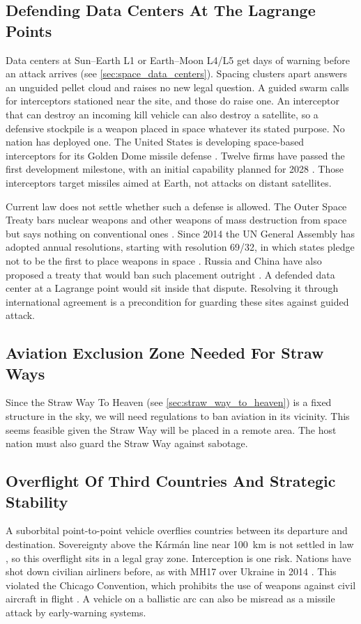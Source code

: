 \documentclass{article}
\begin{document}
\subsection{Defending Data Centers At The Lagrange Points}\label{sec:lpoint_defense_policy}
Data centers at Sun--Earth L1 or Earth--Moon L4/L5 get days of warning before an attack arrives (see \autoref{sec:space_data_centers}). Spacing clusters apart answers an unguided pellet cloud and raises no new legal question. A guided swarm calls for interceptors stationed near the site, and those do raise one. An interceptor that can destroy an incoming kill vehicle can also destroy a satellite, so a defensive stockpile is a weapon placed in space whatever its stated purpose. No nation has deployed one. The United States is developing space-based interceptors for its Golden Dome missile defense \cite{crs_golden_dome}. Twelve firms have passed the first development milestone, with an initial capability planned for 2028 \cite{hitchens2026_sbi_gate1}. Those interceptors target missiles aimed at Earth, not attacks on distant satellites.

Current law does not settle whether such a defense is allowed. The Outer Space Treaty bars nuclear weapons and other weapons of mass destruction from space but says nothing on conventional ones \cite{outer_space_treaty}. Since 2014 the UN General Assembly has adopted annual resolutions, starting with resolution 69/32, in which states pledge not to be the first to place weapons in space \cite{liu2016_no_first_placement}. Russia and China have also proposed a treaty that would ban such placement outright \cite{tronchetti2015_ppwt}. A defended data center at a Lagrange point would sit inside that dispute. Resolving it through international agreement is a precondition for guarding these sites against guided attack.

\subsection{Aviation Exclusion Zone Needed For Straw Ways}
Since the Straw Way To Heaven (see \autoref{sec:straw_way_to_heaven}) is a fixed structure in the sky, we will need regulations to ban aviation in its vicinity.   This seems feasible given the Straw Way will be placed in a remote area.   The host nation must also guard the Straw Way against sabotage.


\subsection{Overflight Of Third Countries And Strategic Stability}\label{sec:overflight_politics}
A suborbital point-to-point vehicle overflies countries between its departure and destination. Sovereignty above the Kármán line near \SI{100}{\kilo\meter} is not settled in law \cite{mcdowell2018karman}, so this overflight sits in a legal gray zone. Interception is one risk. Nations have shot down civilian airliners before, as with MH17 over Ukraine in 2014 \cite{dsb_mh17}. This violated the Chicago Convention, which prohibits the use of weapons against civil aircraft in flight \cite{chicago_3bis}. A vehicle on a ballistic arc can also be misread as a missile attack by early-warning systems.
\end{document}
